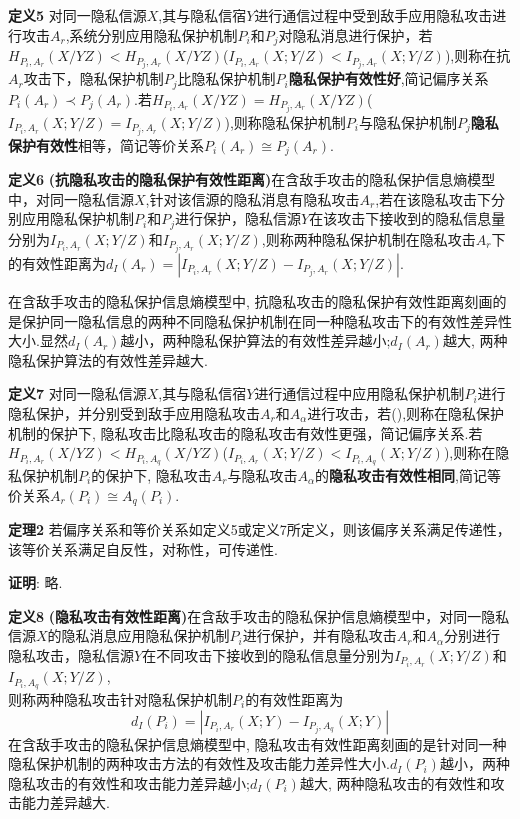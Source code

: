 \textbf{定义5} 对同一隐私信源$X$,其与隐私信宿$Y$进行通信过程中受到敌手应用隐私攻击进行攻击$A_{r}$,系统分别应用隐私保护机制$P_{i}$和$P_{j}$对隐私消息进行保护，若$H_{P_{i},A_{r}}(X/YZ)<H_{P_{j},A_{r}}(X/YZ)$($I_{P_{i},A_{r}}(X;Y/Z)<I_{P_{j},A_{r}}(X;Y/Z)$),则称在抗$A_{r}$攻击下，隐私保护机制$P_{j}$比隐私保护机制$P_{i}$\textbf{隐私保护有效性好},简记偏序关系$P_{i}(A_{r})\prec P_{j}(A_{r})$.若$H_{P_{i},A_{r}}(X/YZ)=H_{P_{j},A_{r}}(X/YZ)$($I_{P_{i},A_{r}}(X;Y/Z)=I_{P_{j},A_{r}}(X;Y/Z)$),则称隐私保护机制$P_{i}$与隐私保护机制$P_{j}$\textbf{隐私保护有效性}相等，简记等价关系$P_{i}(A_{r})\cong P_{j}(A_{r})$.

\textbf{定义6} \textbf{(抗隐私攻击的隐私保护有效性距离)}在含敌手攻击的隐私保护信息熵模型中，对同一隐私信源$X$,针对该信源的隐私消息有隐私攻击$A_{r}$,若在该隐私攻击下分别应用隐私保护机制$P_{i}$和$P_{j}$进行保护，隐私信源$Y$在该攻击下接收到的隐私信息量分别为$I_{P_{i},A_{r}}(X;Y/Z)$和$I_{P_{j},A_{r}}(X;Y/Z)$,则称两种隐私保护机制在隐私攻击$A_{r}$下的有效性距离为$d_{I}(A_{r})=\left | I_{P_{i},A_{r}}(X;Y/Z)-I_{P_{j},A_{r}}(X;Y/Z) \right |$.

在含敌手攻击的隐私保护信息熵模型中, 抗隐私攻击的隐私保护有效性距离刻画的是保护同一隐私信息的两种不同隐私保护机制在同一种隐私攻击下的有效性差异性大小.显然$d_{I}(A_{r})$越小，两种隐私保护算法的有效性差异越小;$d_{I}(A_{r})$越大, 两种隐私保护算法的有效性差异越大.

\textbf{定义7} 对同一隐私信源$X$,其与隐私信宿$Y$进行通信过程中应用隐私保护机制$P_{i}$进行隐私保护，并分别受到敌手应用隐私攻击$A_{r}$和$A_{\alpha }$进行攻击，若(),则称在隐私保护机制的保护下, 隐私攻击比隐私攻击的隐私攻击有效性更强，简记偏序关系.若$H_{P_{i},A_{r}}(X/YZ)<H_{P_{i},A_{q}}(X/YZ)$($I_{P_{i},A_{r}}(X;Y/Z)<I_{P_{i},A_{q}}(X;Y/Z)$),则称在隐私保护机制$P_{i}$的保护下, 隐私攻击$A_{r}$与隐私攻击$A_{\alpha }$的\textbf{隐私攻击有效性相同},简记等价关系$A_{r}(P_{i})\cong A_{q}(P_{i})$.

\textbf{定理2} 若偏序关系和等价关系如定义5或定义7所定义，则该偏序关系满足传递性，该等价关系满足自反性，对称性，可传递性.

\textbf{证明}: 略.

\textbf{定义8} \textbf{(隐私攻击有效性距离)}在含敌手攻击的隐私保护信息熵模型中，对同一隐私信源$X$的隐私消息应用隐私保护机制$P_{i}$进行保护，并有隐私攻击$A_{r}$和$A_{\alpha}$分别进行隐私攻击，隐私信源$Y$在不同攻击下接收到的隐私信息量分别为$I_{P_{i},A_{r}}(X;Y/Z)$和$I_{P_{i},A_{q}}(X;Y/Z)$,\\则称两种隐私攻击针对隐私保护机制$P_{i}$的有效性距离为
\begin{equation*}
d_{I}(P_{i})=\left | I_{P_{i},A_{r}}(X;Y)-I_{P_{j},A_{q}}(X;Y) \right |
\end{equation*}
在含敌手攻击的隐私保护信息熵模型中, 隐私攻击有效性距离刻画的是针对同一种隐私保护机制的两种攻击方法的有效性及攻击能力差异性大小.$d_{I}(P_{i})$越小，两种隐私攻击的有效性和攻击能力差异越小;$d_{I}(P_{i})$越大, 两种隐私攻击的有效性和攻击能力差异越大.

